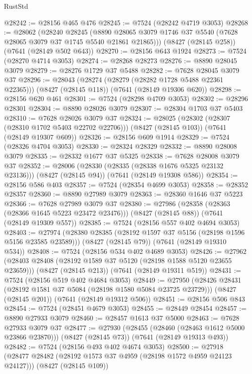 \begin{lexlean}{RustStd}
\begin{coremodule}
{\begin{coremodule}
{{{{{{{{{{{{{{{{{{{{{{{{{{{{{{{{@28242 := @28156 @465 @476
@28245 := @7524 (@28242 @4719 @3053)
@28268 := @28062
    (@28240
      @28245
      (@8890 @28065 @3079 @1746 @37 @5540 (@7628 @28065 @3079 @37 @1745 @5540 @21861 @21865)))
    (@8427 (@28145 @258))
    (@7641 (@28149 @502 @643))
@28270 := @28156 @643 @1924
@28273 := @7524 (@28270 @4714 @3053)
@28274 := @28268 @28273
@28276 := @8890 @28045 @3079
@28279 := @28276 @1729 @37 @5488
@28282 := @7628 @28045 @3079 @37
@28296 := @28043
    (@28274 (@28279 (@28282 @1728 @5488 @22361 @22365)))
    (@8427 (@28145 @118))
    (@7641 (@28149 @19306 @620))
@28298 := @28156 @620 @461
@28301 := @7524 (@28298 @4709 @3053)
@28302 := @28296 @28301
@28304 := @8890 @28026 @3079
@28307 := @28304 @1703 @37 @5403
@28310 := @7628 @28026 @3079 @37
@28324 := @28025
    (@28302 (@28307 (@28310 @1702 @5403 @22702 @22706)))
    (@8427 (@28145 @103))
    (@7641 (@28149 @19307 @609))
@28326 := @28156 @609 @1914
@28329 := @7524 (@28326 @4704 @3053)
@28330 := @28324 @28329
@28332 := @8890 @28008 @3079
@28335 := @28332 @1677 @37 @5325
@28338 := @7628 @28008 @3079 @37
@28352 := @28006
    (@28330 (@28335 (@28338 @1676 @5325 @23132 @23136)))
    (@8427 (@28145 @94))
    (@7641 (@28149 @19308 @586))
@28354 := @28156 @586 @403
@28357 := @7524 (@28354 @4699 @3053)
@28358 := @28352 @28357
@28360 := @8890 @27989 @3079
@28363 := @28360 @1646 @37 @5223
@28366 := @7628 @27989 @3079 @37
@28380 := @27986
    (@28358 (@28363 (@28366 @1645 @5223 @23472 @23476)))
    (@8427 (@28145 @88))
    (@7641 (@28149 @19309 @557))
@28385 := @7524 (@28156 @557 @402 @4694 @3053)
@28403 := @27974
    (@28380 @28385 (@28192 @1597 @37 @5156 (@28198 @1596 @5156 @23585 @23589)))
    (@8427 (@28145 @79))
    (@7641 (@28149 @19310 @534))
@28408 := @7524 (@28156 @534 @402 @4689 @3053)
@28426 := @27962
    (@28403 @28408 (@28192 @1589 @37 @5120 (@28198 @1588 @5120 @23655 @23659)))
    (@8427 (@28145 @213))
    (@7641 (@28149 @19311 @519))
@28431 := @7524 (@28156 @519 @402 @4684 @3053)
@28449 := @27950
    (@28426 @28431 (@28192 @1581 @37 @5084 (@28198 @1580 @5084 @23725 @23729)))
    (@8427 (@28145 @201))
    (@7641 (@28149 @19312 @506))
@28451 := @28156 @506 @843
@28454 := @7524 (@28451 @4679 @3053)
@28455 := @28449 @28454
@28457 := @8890 @27933 @3079
@28460 := @28457 @1613 @37 @5000
@28463 := @7628 @27933 @3079 @37
@28477 := @27930
    (@28455 (@28460 (@28463 @1612 @5000 @23866 @23870)))
    (@8427 (@28145 @73))
    (@7641 (@28149 @19313 @493))
@28482 := @7524 (@28156 @493 @402 @4674 @3053)
@28500 := @27918
    (@28477 @28482 (@28192 @1573 @37 @4959 (@28198 @1572 @4959 @24123 @24127)))
    (@8427 (@28145 @109))
}}}}}}}}}}}}}}}}}}}}}}}}}}}}}}}}
\end{coremodule}}
\end{coremodule}
\end{lexlean}
